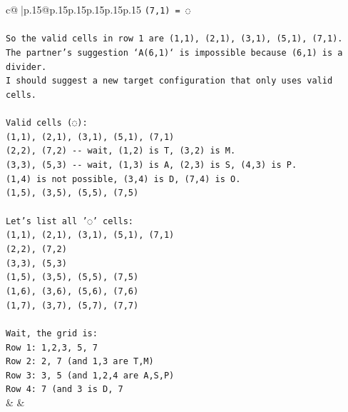 \documentclass{article}
\begin{document}
{\begin{supertabular}{c@{$\;$}|p{.15\linewidth}@{}p{.15\linewidth}p{.15\linewidth}p{.15\linewidth}p{.15\linewidth}p{.15\linewidth}}
{{{\texttt{(7,1) = ◌} \\
\\ 
\texttt{So the valid cells in row 1 are (1,1), (2,1), (3,1), (5,1), (7,1).} \\
\texttt{The partner's suggestion `A(6,1)` is impossible because (6,1) is a divider.} \\
\texttt{I should suggest a new target configuration that only uses valid cells.} \\
\\ 
\texttt{Valid cells (◌):} \\
\texttt{(1,1), (2,1), (3,1), (5,1), (7,1)} \\
\texttt{(2,2), (7,2) {-}{-} wait, (1,2) is T, (3,2) is M.} \\
\texttt{(3,3), (5,3) {-}{-} wait, (1,3) is A, (2,3) is S, (4,3) is P.} \\
\texttt{(1,4) is not possible, (3,4) is D, (7,4) is O.} \\
\texttt{(1,5), (3,5), (5,5), (7,5)} \\
\\ 
\texttt{Let's list all '◌' cells:} \\
\texttt{(1,1), (2,1), (3,1), (5,1), (7,1)} \\
\texttt{(2,2), (7,2)} \\
\texttt{(3,3), (5,3)} \\
\texttt{(1,5), (3,5), (5,5), (7,5)} \\
\texttt{(1,6), (3,6), (5,6), (7,6)} \\
\texttt{(1,7), (3,7), (5,7), (7,7)} \\
\\ 
\texttt{Wait, the grid is:} \\
\texttt{Row 1: 1,2,3, 5, 7} \\
\texttt{Row 2: 2, 7 (and 1,3 are T,M)} \\
\texttt{Row 3: 3, 5 (and 1,2,4 are A,S,P)} \\
\texttt{Row 4: 7 (and 3 is D, 7} \\
            }
        }
    }
    & & \\ \\


\end{supertabular}}
\end{document}
